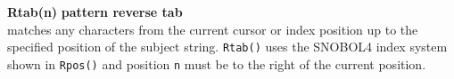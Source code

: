 \documentclass{article}
\begin{document}
\noindent\textbf{Rtab(n)} \hfill\textbf{pattern reverse tab}\\
matches any characters from the current cursor or index position up to the specified position of the subject string.  \texttt{Rtab()} uses the SNOBOL4 index system shown in \texttt{Rpos()} and position \texttt{n} must be to the right of the current position.\\
\end{document}
